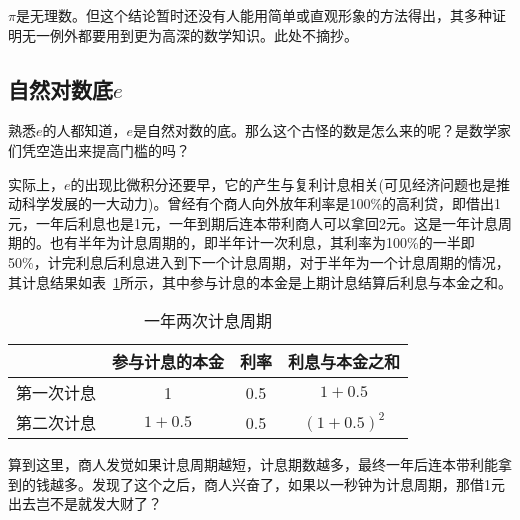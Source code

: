 \begin{example}
  $\pi$是无理数。但这个结论暂时还没有人能用简单或直观形象的方法得出，其多种证明无一例外都要用到更为高深的数学知识。此处不摘抄。
\end{example}

\subsection{自然对数底$e$}
\label{sec:irrational-number-e}

熟悉$e$的人都知道，$e$是自然对数的底。那么这个古怪的数是怎么来的呢？是数学家们凭空造出来提高门槛的吗？

实际上，$e$的出现比微积分还要早，它的产生与复利计息相关(可见经济问题也是推动科学发展的一大动力)。曾经有个商人向外放年利率是100\%的高利贷，即借出1元，一年后利息也是1元，一年到期后连本带利商人可以拿回2元。这是一年计息周期的。也有半年为计息周期的，即半年计一次利息，其利率为100\%的一半即50\%，计完利息后利息进入到下一个计息周期，对于半年为一个计息周期的情况，其计息结果如表~\ref{tab:e-compound-interest}所示，其中参与计息的本金是上期计息结算后利息与本金之和。
\begin{table}[htbp]
  \centering
  \caption{一年两次计息周期}
  \label{tab:e-compound-interest}
  \begin{tabular}{c|ccc}
    \hline
              & 参与计息的本金 & 利率 & 利息与本金之和\\\hline
    第一次计息 & 1             & 0.5 & $1 + 0.5$ \\
    第二次计息 & $1 + 0.5$     & 0.5 & $(1 + 0.5)^2$ \\
    \hline
  \end{tabular}
\end{table}



算到这里，商人发觉如果计息周期越短，计息期数越多，最终一年后连本带利能拿到的钱越多。发现了这个之后，商人兴奋了，如果以一秒钟为计息周期，那借1元出去岂不是就发大财了？

